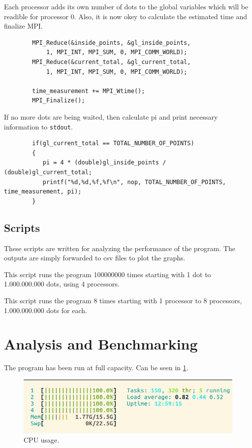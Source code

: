 \documentclass[12pt,a4paper]{article}
\begin{document}
        Each processor adds its own number of dots to the global variables which will be
        readible for processor 0.
        Also, it is now okey to calculate the estimated time and finalize MPI.
        \begin{lstlisting}
        MPI_Reduce(&inside_points, &gl_inside_points,
            1, MPI_INT, MPI_SUM, 0, MPI_COMM_WORLD);
        MPI_Reduce(&current_total, &gl_current_total,
            1, MPI_INT, MPI_SUM, 0, MPI_COMM_WORLD);

        time_measurement += MPI_Wtime();
        MPI_Finalize();
        \end{lstlisting}

        If no more dots are being waited, then calculate pi and print necessary information to \texttt{stdout}.
        \begin{lstlisting}
        if(gl_current_total == TOTAL_NUMBER_OF_POINTS)
        {
           pi = 4 * (double)gl_inside_points / (double)gl_current_total;
           printf("%d,%d,%f,%f\n", nop, TOTAL_NUMBER_OF_POINTS, time_measurement, pi);
        }
        \end{lstlisting}
    
    \subsection{Scripts}
    These scripts are written for analyzing the performance of the program. The outputs are simply forwarded to csv files
    to plot the graphs.

    This script runs the program 100000000 times starting with 1 dot to 1.000.000.000 dots, using 4 processors.
    

    This script runs the program 8 times starting with 1 processor to 8 processors, 1.000.000.000 dots for each.
    

    \section{Analysis and Benchmarking}
    The program has been run at full capacity. Can be seen in \figurename{} \ref{cpu}.
    \begin{figure}[!h]
        \begin{center}
            \includegraphics[width=\linewidth]{resimler/cpus.png}
            \caption{CPU usage.}
            \label{cpu}
        \end{center}
    \end{figure}
\end{document}
